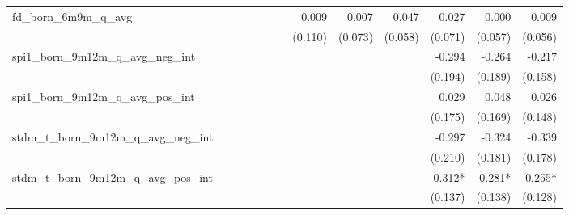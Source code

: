 \begin{tabular}{lrrrrrrrrrrrr}
fd\_born\_6m9m\_q\_avg                      &              &              &              &              &              &              &        0.009 &        0.007 &        0.047 &        0.027 &        0.000 &        0.009 \\ 
                                            &              &              &              &              &              &              &      (0.110) &      (0.073) &      (0.058) &      (0.071) &      (0.057) &      (0.056) \\ 
spi1\_born\_9m12m\_q\_avg\_neg\_int         &              &              &              &              &              &              &              &              &              &       -0.294 &       -0.264 &       -0.217 \\ 
                                            &              &              &              &              &              &              &              &              &              &      (0.194) &      (0.189) &      (0.158) \\ 
spi1\_born\_9m12m\_q\_avg\_pos\_int         &              &              &              &              &              &              &              &              &              &        0.029 &        0.048 &        0.026 \\ 
                                            &              &              &              &              &              &              &              &              &              &      (0.175) &      (0.169) &      (0.148) \\ 
stdm\_t\_born\_9m12m\_q\_avg\_neg\_int      &              &              &              &              &              &              &              &              &              &       -0.297 &       -0.324 &       -0.339 \\ 
                                            &              &              &              &              &              &              &              &              &              &      (0.210) &      (0.181) &      (0.178) \\ 
stdm\_t\_born\_9m12m\_q\_avg\_pos\_int      &              &              &              &              &              &              &              &              &              &       0.312* &       0.281* &       0.255* \\ 
                                            &              &              &              &              &              &              &              &              &              &      (0.137) &      (0.138) &      (0.128) \\ 

\end{tabular}
